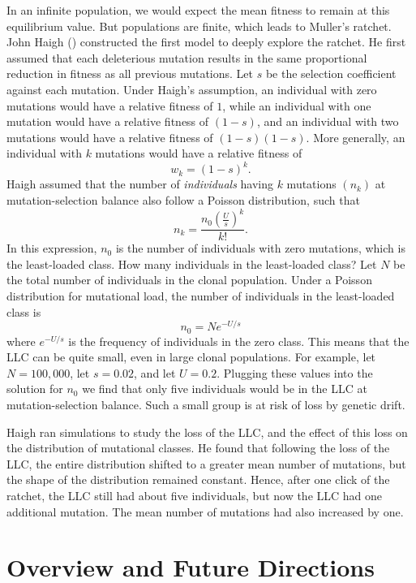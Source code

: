 \documentclass[
  letterpaper,
]{book}
\begin{document}
In an infinite population, we would expect the mean fitness to remain at
this equilibrium value. But populations are finite, which leads to
Muller's ratchet. John Haigh ()
constructed the first model to deeply explore the ratchet. He first
assumed that each deleterious mutation results in the same proportional
reduction in fitness as all previous mutations. Let \(s\) be the
selection coefficient against each mutation. Under Haigh's assumption,
an individual with zero mutations would have a relative fitness of
\(1\), while an individual with one mutation would have a relative
fitness of \((1-s)\), and an individual with two mutations would have a
relative fitness of \((1-s)(1-s)\). More generally, an individual with
\(k\) mutations would have a relative fitness of \[w_k=(1-s)^k.\] Haigh
assumed that the number of \emph{individuals} having \(k\) mutations
\((n_k)\) at mutation-selection balance also follow a Poisson
distribution, such that
\[n_k=\frac{n_0\left(\frac{U}{s}\right)^k}{k!}.\] In this expression,
\(n_0\) is the number of individuals with zero mutations, which is the
least-loaded class. How many individuals in the least-loaded class? Let
\(N\) be the total number of individuals in the clonal population. Under
a Poisson distribution for mutational load, the number of individuals in
the least-loaded class is \[n_0=Ne^{-U/s}\] where \(e^{-U/s}\) is the
frequency of individuals in the zero class. This means that the LLC can
be quite small, even in large clonal populations. For example, let
\(N = 100,000\), let \(s = 0.02\), and let \(U = 0.2\). Plugging these
values into the solution for \(n_0\) we find that only five individuals
would be in the LLC at mutation-selection balance. Such a small group is
at risk of loss by genetic drift.

Haigh ran simulations to study the loss of the LLC, and the effect of
this loss on the distribution of mutational classes. He found that
following the loss of the LLC, the entire distribution shifted to a
greater mean number of mutations, but the shape of the distribution
remained constant. Hence, after one click of the ratchet, the LLC still
had about five individuals, but now the LLC had one additional mutation.
The mean number of mutations had also increased by one.


\chapter{Overview and Future
Directions}\label{overview-and-future-directions}
\end{document}
